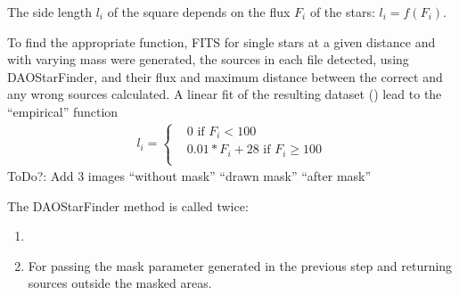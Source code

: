 \documentclass[letterpaper,10pt,english]{sphinxmanual}
\begin{document}
\sphinxAtStartPar
The side length \(l_i\) of the square depends on the flux \(F_i\) of the stars: \(l_i = f(F_i)\).

\sphinxAtStartPar
To find the appropriate function, FITS for single stars at a given distance and with varying mass were generated,
the sources in each file detected, using DAOStarFinder, and their flux and maximum distance between the correct and any wrong sources calculated.
A linear fit of the resulting dataset ({\hyperref[\detokenize{NBodySimulation/Appendix:appendix-label}]{}}) lead to the “empirical” function
\begin{equation}\label{equation:NBodySimulation/DataReduction:side_length}
\begin{split}l_i = \begin{cases}
 & 0\text{ if } F_i < 100\\
 & 0.01*F_i+28\text{ if } F_i \geqslant 100\\
\end{cases}\end{split}
\end{equation}
\sphinxAtStartPar
ToDo?: Add 3 images “without mask” “drawn mask” “after mask”

\sphinxAtStartPar
The DAOStarFinder method is called twice:
\begin{enumerate}
%
\item {} 

\item {} 
\sphinxAtStartPar
For passing the mask parameter generated in the previous step and returning sources outside the masked areas.

\end{enumerate}
\end{document}
